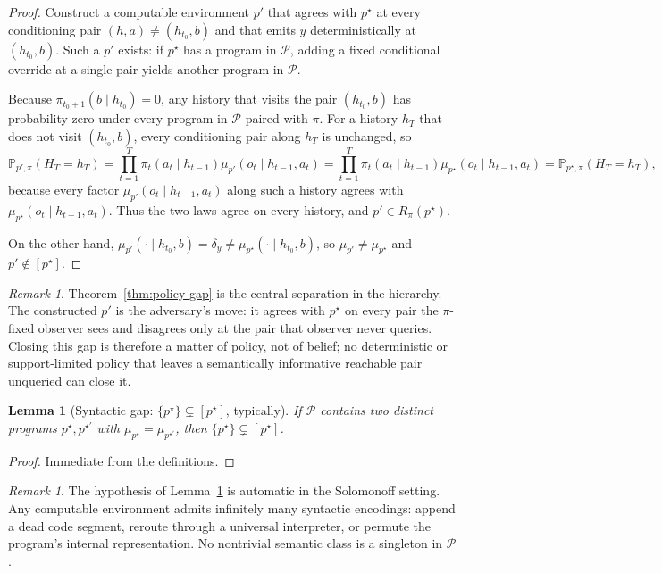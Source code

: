 \documentclass[11pt]{article}
\newtheorem{lemma}[theorem]{Lemma}
\theoremstyle{definition}
\theoremstyle{remark}
\newtheorem{remark}[theorem]{Remark}
\newcommand{\Pcal}{\mathcal{P}}
\newcommand{\Prob}{\mathbb{P}}
\begin{document}
\begin{proof}
Construct a computable environment $p'$ that agrees with $p^\star$ at every conditioning pair $(h,a)\neq(h_{t_0},b)$ and that emits $y$ deterministically at $(h_{t_0},b)$. Such a $p'$ exists: if $p^\star$ has a program in $\Pcal$, adding a fixed conditional override at a single pair yields another program in $\Pcal$.

Because $\pi_{t_0+1}(b\mid h_{t_0})=0$, any history that visits the pair $(h_{t_0},b)$ has probability zero under every program in $\Pcal$ paired with $\pi$. For a history $h_T$ that does not visit $(h_{t_0},b)$, every conditioning pair along $h_T$ is unchanged, so
\[
\Prob_{p',\pi}(H_T=h_T)
=
\prod_{t=1}^T \pi_t(a_t\mid h_{t-1})\mu_{p'}(o_t\mid h_{t-1},a_t)
=
\prod_{t=1}^T \pi_t(a_t\mid h_{t-1})\mu_{p^\star}(o_t\mid h_{t-1},a_t)
=
\Prob_{p^\star,\pi}(H_T=h_T),
\]
because every factor $\mu_{p'}(o_t\mid h_{t-1},a_t)$ along such a history agrees with $\mu_{p^\star}(o_t\mid h_{t-1},a_t)$. Thus the two laws agree on every history, and $p'\in R_\pi(p^\star)$.

On the other hand, $\mu_{p'}(\cdot\mid h_{t_0},b)=\delta_y\neq \mu_{p^\star}(\cdot\mid h_{t_0},b)$, so $\mu_{p'}\neq\mu_{p^\star}$ and $p'\notin [p^\star]$.
\end{proof}

\begin{remark}
Theorem~\ref{thm:policy-gap} is the central separation in the hierarchy. The constructed $p'$ is the adversary's move: it agrees with $p^\star$ on every pair the $\pi$-fixed observer sees and disagrees only at the pair that observer never queries. Closing this gap is therefore a matter of policy, not of belief; no deterministic or support-limited policy that leaves a semantically informative reachable pair unqueried can close it.
\end{remark}

\begin{lemma}[{Syntactic gap: $\{p^\star\}\subsetneq [p^\star]$, typically}]
\label{lem:syntactic-gap}
If $\Pcal$ contains two distinct programs $p^\star, p^{\star\prime}$ with $\mu_{p^\star}=\mu_{p^{\star\prime}}$, then $\{p^\star\}\subsetneq [p^\star]$.
\end{lemma}

\begin{proof}
Immediate from the definitions.
\end{proof}

\begin{remark}
The hypothesis of Lemma~\ref{lem:syntactic-gap} is automatic in the Solomonoff setting. Any computable environment admits infinitely many syntactic encodings: append a dead code segment, reroute through a universal interpreter, or permute the program's internal representation. No nontrivial semantic class is a singleton in $\Pcal$.
\end{remark}
\end{document}
